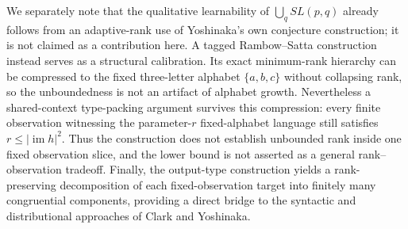 \documentclass[11pt,a4paper]{article}
\numberwithin{equation}{section}
\theoremstyle{plain}
\theoremstyle{definition}
\theoremstyle{remark}
\begin{document}
We separately note that the qualitative learnability of $\bigcup_q SL(p,q)$
already follows from an adaptive-rank use of Yoshinaka's own conjecture
construction; it is not claimed as a contribution here.  A tagged
Rambow--Satta construction instead serves as a structural calibration.  Its
exact minimum-rank hierarchy can be compressed to the fixed three-letter
alphabet $\{a,b,c\}$ without collapsing rank, so the unboundedness is not an
artifact of alphabet growth.  Nevertheless a shared-context type-packing
argument survives this compression: every finite observation witnessing the
parameter-$r$ fixed-alphabet language still satisfies
$r\le |\operatorname{im}h|^2$.  Thus the construction does not establish
unbounded rank inside one fixed observation slice, and the lower bound is not
asserted as a general rank--observation tradeoff.  Finally, the output-type
construction yields a rank-preserving decomposition of each fixed-observation
target into finitely many congruential components, providing a direct bridge
to the syntactic and distributional approaches of Clark and Yoshinaka.
\end{document}

